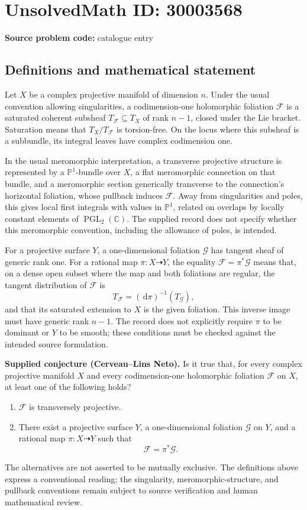 \documentclass[11pt]{article}
\newcommand{\C}{\mathbb{C}}
\newcommand{\PP}{\mathbb{P}}
\newcommand{\dd}{\,\mathrm{d}}
\begin{document}
\section*{UnsolvedMath ID: 30003568}
\textbf{Source problem code:} catalogue entry
\subsection{Definitions and mathematical statement}
Let \(X\) be a complex projective manifold of dimension \(n\). Under the usual convention allowing singularities, a codimension-one holomorphic foliation \(\mathcal F\) is a saturated coherent subsheaf \(T_{\mathcal F}\subseteq T_X\) of rank \(n-1\), closed under the Lie bracket. Saturation means that \(T_X/T_{\mathcal F}\) is torsion-free. On the locus where this subsheaf is a subbundle, its integral leaves have complex codimension one.

In the usual meromorphic interpretation, a transverse projective structure is represented by a \(\PP^1\)-bundle over \(X\), a flat meromorphic connection on that bundle, and a meromorphic section generically transverse to the connection's horizontal foliation, whose pullback induces \(\mathcal F\). Away from singularities and poles, this gives local first integrals with values in \(\PP^1\), related on overlaps by locally constant elements of \(\operatorname{PGL}_2(\C)\). The supplied record does not specify whether this meromorphic convention, including the allowance of poles, is intended.

For a projective surface \(Y\), a one-dimensional foliation \(\mathcal G\) has tangent sheaf of generic rank one. For a rational map \(\pi:X\dashrightarrow Y\), the equality \(\mathcal F=\pi^*\mathcal G\) means that, on a dense open subset where the map and both foliations are regular, the tangent distribution of \(\mathcal F\) is
\[
T_{\mathcal F}=(\dd\pi)^{-1}(T_{\mathcal G}),
\]
and that its saturated extension to \(X\) is the given foliation. This inverse image must have generic rank \(n-1\). The record does not explicitly require \(\pi\) to be dominant or \(Y\) to be smooth; these conditions must be checked against the intended source formulation.

\textbf{Supplied conjecture (Cerveau--Lins Neto).} Is it true that, for every complex projective manifold \(X\) and every codimension-one holomorphic foliation \(\mathcal F\) on \(X\), at least one of the following holds?
\begin{enumerate}
\item \(\mathcal F\) is transversely projective.
\item There exist a projective surface \(Y\), a one-dimensional foliation \(\mathcal G\) on \(Y\), and a rational map \(\pi:X\dashrightarrow Y\) such that
\[
\mathcal F=\pi^*\mathcal G.
\]
\end{enumerate}
The alternatives are not asserted to be mutually exclusive. The definitions above express a conventional reading; the singularity, meromorphic-structure, and pullback conventions remain subject to source verification and human mathematical review.
\end{document}
